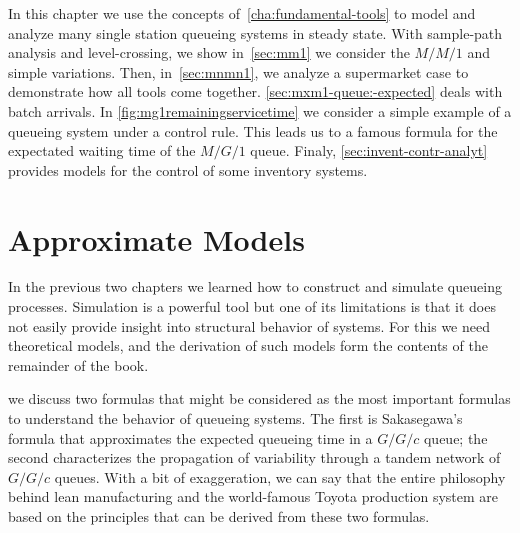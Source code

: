
In this chapter we use the concepts of~\cref{cha:fundamental-tools} to model and analyze many single station queueing systems in steady state.
With sample-path analysis and level-crossing, we show in~\cref{sec:mm1} we consider the $M/M/1$ and simple variations.
Then, in~\cref{sec:mnmn1}, we analyze a supermarket case to demonstrate how all tools come together.
\cref{sec:mxm1-queue:-expected} deals with batch arrivals.
In \cref{fig:mg1remainingservicetime} we consider a simple example of a queueing system under a control rule.
This leads us to a famous formula for the expectated waiting time of the $M/G/1$ queue. Finaly, \cref{sec:invent-contr-analyt} provides models for the control of some inventory systems.








%
%
%



\chapter{Approximate Models}
\label{cha:approximate-models}


In the previous two chapters we learned how to construct and simulate queueing processes.
Simulation is a powerful tool but one of its limitations is that it does not easily provide insight into structural behavior of systems.
For this we need theoretical models, and the derivation of such models form the contents of the remainder of the book.


 we discuss two formulas that might be considered as the most important formulas to understand the behavior of queueing systems.
The first is Sakasegawa's formula that approximates the expected queueing time in a $G/G/c$ queue; the second characterizes the propagation of variability through a tandem network of $G/G/c$ queues.
With a bit of exaggeration, we can  say that the entire philosophy behind lean manufacturing and the world-famous Toyota production system are based on the principles that can be derived from these two formulas.

